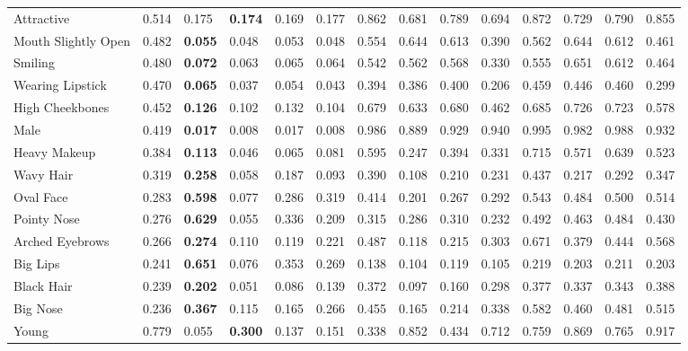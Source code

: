 \begin{tabular}{lrllrrrrrrrrrr}
\hline
 Attractive          & 0.514 & 0.175     & \bf 0.174 & 0.169 & 0.177 & 0.862 & 0.681 & 0.789 & 0.694 & 0.872 & 0.729 & 0.790 & 0.855 \\
 Mouth Slightly Open & 0.482 & \bf 0.055 & 0.048     & 0.053 & 0.048 & 0.554 & 0.644 & 0.613 & 0.390 & 0.562 & 0.644 & 0.612 & 0.461 \\
 Smiling             & 0.480 & \bf 0.072 & 0.063     & 0.065 & 0.064 & 0.542 & 0.562 & 0.568 & 0.330 & 0.555 & 0.651 & 0.612 & 0.464 \\
 Wearing Lipstick    & 0.470 & \bf 0.065 & 0.037     & 0.054 & 0.043 & 0.394 & 0.386 & 0.400 & 0.206 & 0.459 & 0.446 & 0.460 & 0.299 \\
 High Cheekbones     & 0.452 & \bf 0.126 & 0.102     & 0.132 & 0.104 & 0.679 & 0.633 & 0.680 & 0.462 & 0.685 & 0.726 & 0.723 & 0.578 \\
 Male                & 0.419 & \bf 0.017 & 0.008     & 0.017 & 0.008 & 0.986 & 0.889 & 0.929 & 0.940 & 0.995 & 0.982 & 0.988 & 0.932 \\
 Heavy Makeup        & 0.384 & \bf 0.113 & 0.046     & 0.065 & 0.081 & 0.595 & 0.247 & 0.394 & 0.331 & 0.715 & 0.571 & 0.639 & 0.523 \\
 Wavy Hair           & 0.319 & \bf 0.258 & 0.058     & 0.187 & 0.093 & 0.390 & 0.108 & 0.210 & 0.231 & 0.437 & 0.217 & 0.292 & 0.347 \\
 Oval Face           & 0.283 & \bf 0.598 & 0.077     & 0.286 & 0.319 & 0.414 & 0.201 & 0.267 & 0.292 & 0.543 & 0.484 & 0.500 & 0.514 \\
 Pointy Nose         & 0.276 & \bf 0.629 & 0.055     & 0.336 & 0.209 & 0.315 & 0.286 & 0.310 & 0.232 & 0.492 & 0.463 & 0.484 & 0.430 \\
 Arched Eyebrows     & 0.266 & \bf 0.274 & 0.110     & 0.119 & 0.221 & 0.487 & 0.118 & 0.215 & 0.303 & 0.671 & 0.379 & 0.444 & 0.568 \\
 Big Lips            & 0.241 & \bf 0.651 & 0.076     & 0.353 & 0.269 & 0.138 & 0.104 & 0.119 & 0.105 & 0.219 & 0.203 & 0.211 & 0.203 \\
 Black Hair          & 0.239 & \bf 0.202 & 0.051     & 0.086 & 0.139 & 0.372 & 0.097 & 0.160 & 0.298 & 0.377 & 0.337 & 0.343 & 0.388 \\
 Big Nose            & 0.236 & \bf 0.367 & 0.115     & 0.165 & 0.266 & 0.455 & 0.165 & 0.214 & 0.338 & 0.582 & 0.460 & 0.481 & 0.515 \\
 Young               & 0.779 & 0.055     & \bf 0.300 & 0.137 & 0.151 & 0.338 & 0.852 & 0.434 & 0.712 & 0.759 & 0.869 & 0.765 & 0.917 \\

\end{tabular}
